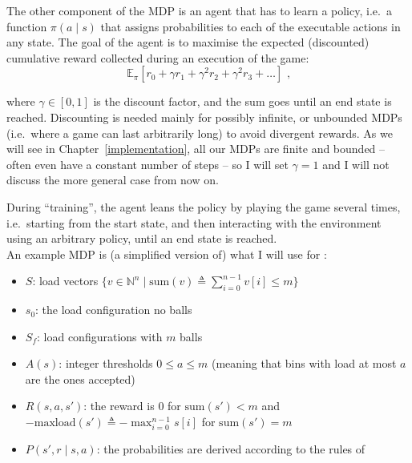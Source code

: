 The other component of the MDP is an agent that has to learn a policy, i.e.\ a function $\pi(a\mid s)$ that assigns probabilities to each of the executable actions in any state. The goal of the agent is to maximise the expected (discounted) cumulative reward collected during an execution of the game:
\begin{equation}\label{eq:cumReward}
\mathbb{E}_{\pi}[r_{0} + \gamma r_{1} + \gamma^2 r_{2} + \gamma^2 r_{3} + \ldots]\text{ ,}
\end{equation}

where $\gamma \in [0, 1]$ is the discount factor, and the sum goes until an end state is reached. Discounting is needed mainly for possibly infinite, or unbounded MDPs (i.e.\ where a game can last arbitrarily long) to avoid divergent rewards. As we will see in Chapter~\ref{implementation}, all our MDPs are finite and bounded -- often even have a constant number of steps -- so I will set $\gamma=1$ and I will not discuss the more general case from now on. 


During ``training'', the agent leans the policy by playing the game several times, i.e.\ starting from the start state, and then interacting with the environment using an arbitrary policy, until an end state is reached.\\

An example MDP is (a simplified version of) what I will use for \TwoThinning:

\begin{itemize}[itemsep=0pt]
    \item 
    $S$: load vectors $\{v\in \mathbb{N}^n\mid\mathrm{sum}(v)\triangleq \sum_{i=0}^{n-1}v[i]\leq m\}$
    \item
    $s_0$: the load configuration no balls
    \item
    $S_f$: load configurations with $m$ balls
    \item
    $A(s)$: integer thresholds $0\leq a\leq m$ (meaning that bins with load at most $a$ are the ones accepted)
    \item
    $R(s, a, s')$: the reward is $0$ for $\mathrm{sum}(s')<m$ and $-\mathrm{maxload}(s')\triangleq -\max_{i=0}^{n-1} s[i]$ for $\mathrm{sum}(s')=m$

    \item
    $P(s', r \mid s, a)$: the probabilities are derived according to the rules of \TwoThinning
\end{itemize}



